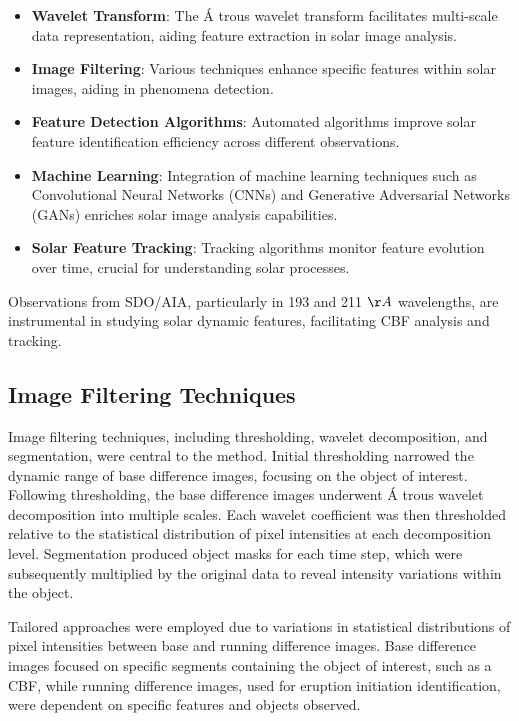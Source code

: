 \begin{itemize}
	\item \textbf{Wavelet Transform}: The \'A trous wavelet transform facilitates multi-scale data representation, aiding feature extraction in solar image analysis.
	
	\item \textbf{Image Filtering}: Various techniques enhance specific features within solar images, aiding in phenomena detection.
	
	\item \textbf{Feature Detection Algorithms}: Automated algorithms improve solar feature identification efficiency across different observations.
	
	\item \textbf{Machine Learning}: Integration of machine learning techniques such as Convolutional Neural Networks (CNNs) and Generative Adversarial Networks (GANs) enriches solar image analysis capabilities.
	
	\item \textbf{Solar Feature Tracking}: Tracking algorithms monitor feature evolution over time, crucial for understanding solar processes.
\end{itemize}

Observations from SDO/AIA, particularly in 193 and 211 $\AA$ wavelengths, are instrumental in studying solar dynamic features, facilitating CBF analysis and tracking.

\subsection{Image Filtering Techniques}
Image filtering techniques, including thresholding, wavelet decomposition, and segmentation, were central to the method. Initial thresholding narrowed the dynamic range of base difference images, focusing on the object of interest.
Following thresholding, the base difference images underwent \'A trous wavelet decomposition into multiple scales. Each wavelet coefficient was then thresholded relative to the statistical distribution of pixel intensities at each decomposition level. Segmentation produced object masks for each time step, which were subsequently multiplied by the original data to reveal intensity variations within the object.

Tailored approaches were employed due to variations in statistical distributions of pixel intensities between base and running difference images. Base difference images focused on specific segments containing the object of interest, such as a CBF, while running difference images, used for eruption initiation identification, were dependent on specific features and objects observed.

